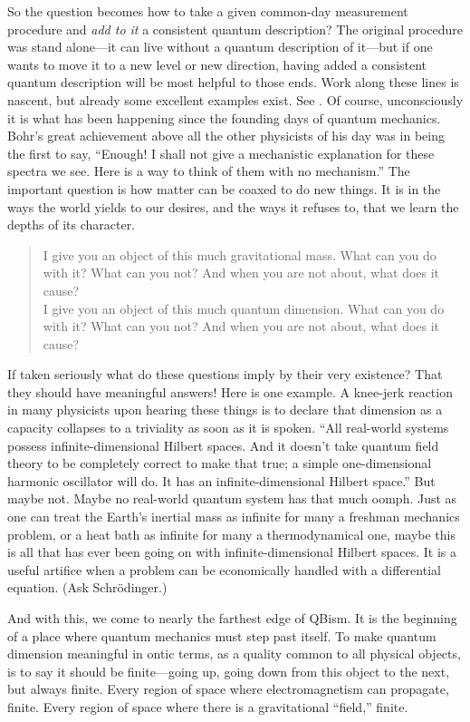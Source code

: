 {So the question becomes how to take a given common-day measurement procedure and {\it add to it\/} a consistent quantum description?  The original procedure was stand alone---it can live without a quantum description of it---but if one wants to move it to a new level or new direction, having added a consistent quantum description will be most helpful to those ends.  Work along these lines is nascent, but already some excellent examples exist.  See \cite{Kofler08}.  Of course, unconsciously it is what has been happening since the founding days of quantum mechanics.}  Bohr's great achieve\-ment above all the other physicists of his day was in being the first to say, ``Enough!  I shall not give a mech\-anistic explanation for these spectra we see.  Here is a way to think of them with no mechanism.''  The important question is how matter can be coaxed to do new things.  It is in the ways the world yields to our desires, and the ways it refuses to, that we learn the depths of its character.
\begin{verse}\small
I give you an object of this much gravitational mass.  What can you do with it?  What can you not?  And when you are not about, what does it cause?
\\
I give you an object of this much quantum dim\-ension.  What can you do with it?  What can you not?  And when you are not about, what does it cause?
\end{verse}

If taken seriously what do these questions imply by their very existence?  That they should have meaningful answers!  Here is one example.  A knee-jerk reaction in many physicists upon hearing these things is to declare that dimension as a capacity collapses to a triviality as soon as it is spoken.  ``All real-world systems possess infinite-dimensional Hilbert spaces.  And it doesn't take quantum field theory to be completely correct to make that true; a simple one-dimensional harmonic oscillator will do.  It has an infinite-dimensional Hilbert space.''  But maybe not.  Maybe no real-world quantum system has that much oomph.  Just as one can treat the Earth's inertial mass as infinite for many a freshman mechanics problem, or a heat bath as infinite for many a thermodynamical one, maybe this is all that has ever been going on with infinite-dimensional Hilbert spaces.  It is a useful artifice when a problem can be economically handled with a differential equation.  (Ask Schr\"odinger.)

And with this, we come to nearly the farthest edge of QBism.  It is the beginning of a place where quantum mechanics must step past itself.  To make quantum dimension meaningful in ontic terms, as a quality common to all physical objects, is to say it should be finite---going up, going down from this object to the next, but always finite.  Every region of space where electromagnetism can propagate, finite.  Every region of space where there is a gravitational ``field,'' finite.

